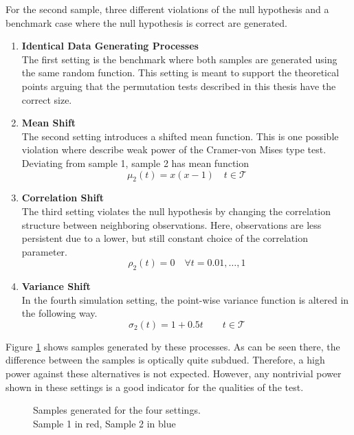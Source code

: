 \documentclass[12pt, a4paper]{article}
\theoremstyle{MAstyle} \newtheorem{assumption}{Assumption}[section]
\theoremstyle{MAstyle} \newtheorem{definition}{Definition}[section]
\theoremstyle{MAstyle} \newtheorem{theorem}{Theorem}[section]
\begin{document}
		For the second sample, three different violations of the null hypothesis and a benchmark case where the null hypothesis is correct are generated.
		\begin{enumerate}
			\item \textbf{Identical Data Generating Processes}\\
				  The first setting is the benchmark where both samples are generated using the same random function. This setting is meant to support the theoretical points arguing that the permutation tests described in this thesis have the correct size.
			\item \textbf{Mean Shift}\\
				  The second setting introduces a shifted mean function. This is one possible violation where \cite{bugni_permutation_2021} describe weak power of the Cramer-von Mises type test. Deviating from sample 1, sample 2 has mean function 
				  $$\mu_2(t) = x (x-1) \quad t \in \mathcal{T}$$
			\newpage
			\item \textbf{Correlation Shift}\\
			 	  The third setting violates the null hypothesis by changing the correlation structure between neighboring observations. Here, observations are less persistent due to a lower, but still constant choice of the correlation parameter.
			 	  $$\rho_2(t) = 0 \quad \forall t = 0.01, \dots, 1$$
			\item \textbf{Variance Shift}\\
				  In the fourth simulation setting, the point-wise variance function is altered in the following way.
				  $$\sigma_2(t) = 1 + 0.5t \quad \quad t \in \mathcal{T}$$
		\end{enumerate}
	
		Figure \ref{settings} shows samples generated by these processes. As can be seen there, the difference between the samples is optically quite subdued. Therefore, a high power against these alternatives is not expected. However, any nontrivial power shown in these settings is a good indicator for the qualities of the test.
		\begin{figure}[H]
			\caption{Samples generated for the four settings. \\
			Sample 1 in red, Sample 2 in blue}
			\label{settings}
		\end{figure}
		
\end{document}
